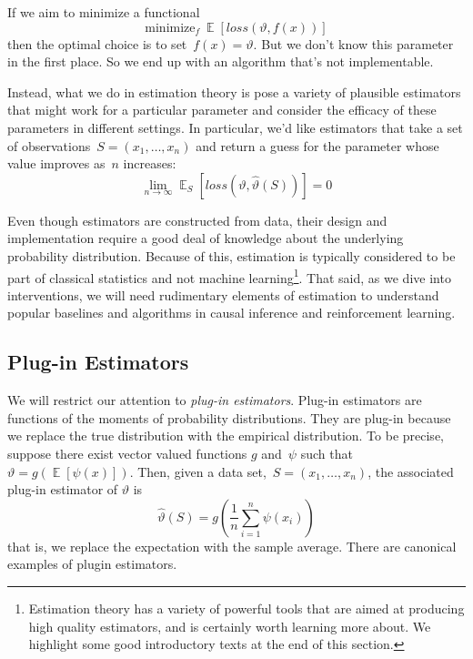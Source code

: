 \documentclass{tufte-book}
\begin{document}
If we aim to minimize a functional \[
    \text{minimize}_f~\mathop\mathbb{E}[\mathit{loss}(\vartheta,f(x))]
\] then the optimal choice is to set~\(f(x) = \vartheta\). But we don't
know this parameter in the first place. So we end up with an algorithm
that's not implementable.

Instead, what we do in estimation theory is pose a variety of plausible
estimators that might work for a particular parameter and consider the
efficacy of these parameters in different settings. In particular, we'd
like estimators that take a set of observations~\(S=(x_1,\ldots,x_n)\)
and return a guess for the parameter whose value improves as~\(n\)
increases: \[
    \lim_{n\rightarrow \infty} \mathop\mathbb{E}_S[\mathit{loss}(\vartheta,\hat{\vartheta}(S))] = 0
\]

Even though estimators are constructed from data, their design and
implementation require a good deal of knowledge about the underlying
probability distribution. Because of this, estimation is typically
considered to be part of classical statistics and not machine
learning\footnote{Estimation theory has a variety of powerful tools that
  are aimed at producing high quality estimators, and is certainly worth
  learning more about. We highlight some good introductory texts at the
  end of this section.}. That said, as we dive into interventions, we
will need rudimentary elements of estimation to understand popular
baselines and algorithms in causal inference and reinforcement learning.

\hypertarget{plug-in-estimators}{%
\subsection{Plug-in Estimators}\label{plug-in-estimators}}

We will restrict our attention to \emph{plug-in
estimators}. Plug-in estimators are functions
of the moments of probability distributions. They are plug-in because we
replace the true distribution with the empirical distribution. To be
precise, suppose there exist vector valued functions \(g\) and~\(\psi\)
such that~\(\vartheta = g(\mathop\mathbb{E}[\psi(x)])\). Then, given a
data set,~\(S=(x_1,\ldots,x_n)\), the associated plug-in estimator of
\(\vartheta\) is \[
\hat{\vartheta}(S) = g\left( \frac{1}{n} \sum_{i=1}^n \psi(x_i)\right)
\] that is, we replace the expectation with the sample average. There
are canonical examples of plugin estimators.
\end{document}
